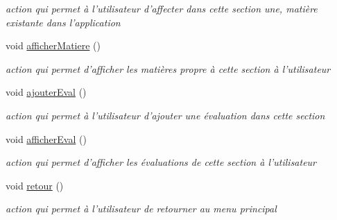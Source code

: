 \begin{DoxyCompactItemize}
\begin{DoxyCompactList}\small\item\em action qui permet à l'utilisateur d'affecter dans cette section une, matière existante dans l'application \end{DoxyCompactList}\item 
\hypertarget{class_section_a1debe78679287f470ce2ae2f8c5fd26d}{void \hyperlink{class_section_a1debe78679287f470ce2ae2f8c5fd26d}{afficher\+Matiere} ()}\label{class_section_a1debe78679287f470ce2ae2f8c5fd26d}

\begin{DoxyCompactList}\small\item\em action qui permet d'afficher les matières propre à cette section à l'utilisateur \end{DoxyCompactList}\item 
\hypertarget{class_section_a61635f5b31db8f7d3a779f751c117e56}{void \hyperlink{class_section_a61635f5b31db8f7d3a779f751c117e56}{ajouter\+Eval} ()}\label{class_section_a61635f5b31db8f7d3a779f751c117e56}

\begin{DoxyCompactList}\small\item\em action qui permet à l'utilisateur d'ajouter une évaluation dans cette section \end{DoxyCompactList}\item 
\hypertarget{class_section_a00d4f5165a2db3d1e30b7fa84c59027c}{void \hyperlink{class_section_a00d4f5165a2db3d1e30b7fa84c59027c}{afficher\+Eval} ()}\label{class_section_a00d4f5165a2db3d1e30b7fa84c59027c}

\begin{DoxyCompactList}\small\item\em action qui permet d'afficher les évaluations de cette section à l'utilisateur \end{DoxyCompactList}\item 
\hypertarget{class_section_a4bacd7ca9f2a152d966c0a19853887d3}{void \hyperlink{class_section_a4bacd7ca9f2a152d966c0a19853887d3}{retour} ()}\label{class_section_a4bacd7ca9f2a152d966c0a19853887d3}

\begin{DoxyCompactList}\small\item\em action qui permet à l'utilisateur de retourner au menu principal \end{DoxyCompactList}\end{DoxyCompactItemize}

